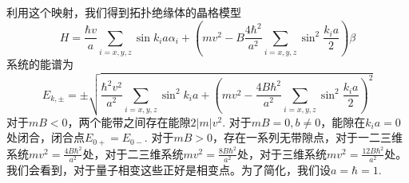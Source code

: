 \documentclass{article}
\numberwithin{equation}{subsection}
\begin{document}
利用这个映射，我们得到拓扑绝缘体的晶格模型
\begin{equation}
    H=\frac{\hbar v}{a}\sum_{i=x,y,z}\sin k_ia\alpha_i+\left(mv^2-B\frac{4\hbar^2}{a^2}\sum_{i=x,y,z}\sin^2\frac{k_ia}{2}\right)\beta
\end{equation}
系统的能谱为
\begin{equation}
    E_{k,\pm}=\pm \sqrt{\frac{\hbar^{2} v^{2}}{a^{2}} \sum_{i=x, y, z} \sin ^{2} k_{i} a+\left(m v^{2}-\frac{4 B \hbar^{2}}{a^{2}} \sum_{i=x, y, z} \sin ^{2} \frac{k_{i} a}{2}\right)^{2}}
\end{equation}
对于$mB<0$，两个能带之间存在能隙$2|m|v^2$. 对于$mB=0,b\neq0$，能隙在$k_ia=0$处闭合，闭合点$E_{0+}=E_{0-}$. 对于$mB>0$，存在一系列无带隙点，对于一二三维系统$mv^2=\frac{4B\hbar^2}{a^2}$处，对于二三维系统$mv^2=\frac{8B\hbar^2}{a^2}$处，对于三维系统$mv^2=\frac{12B\hbar^2}{a^2}$处。我们会看到，对于量子相变这些正好是相变点。为了简化，我们设$a=\hbar=1$.
\end{document}
